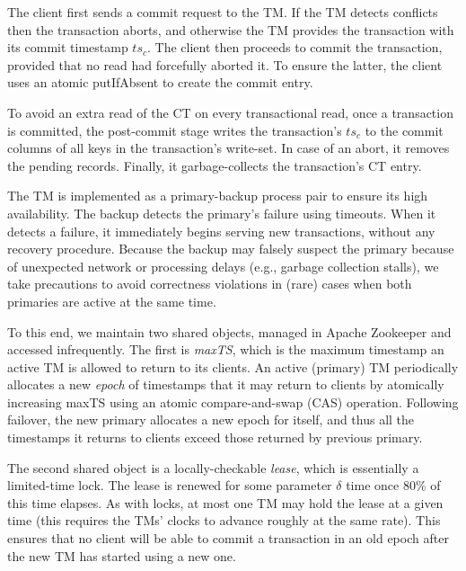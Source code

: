 The client first 
sends a commit request to the TM. 
If the TM detects conflicts then the transaction aborts, and otherwise the TM provides the transaction with its commit  timestamp $ts_c$. 
The client then proceeds to commit the transaction, provided that no read had forcefully aborted  it. To ensure the latter, the client uses 
an atomic putIfAbsent to create the commit entry. 

To avoid an extra read of the CT on every transactional read, once a transaction is committed, the post-commit stage writes 
the transaction's $ts_c$ to the commit columns of all keys in  the transaction's write-set. 
In case of an abort, it removes the pending records.
Finally, it garbage-collects the transaction's CT entry. 


 The TM is implemented as a primary-backup process pair to ensure its high availability. 
The backup detects the primary's failure using timeouts. When it detects a failure, it immediately begins serving new
transactions, without any recovery procedure. Because the backup may falsely suspect the primary because of
unexpected network or processing delays (e.g., garbage collection stalls), we take precautions to avoid correctness
violations in (rare) cases when both primaries are active at the same time.

To this end, we maintain two shared objects, managed in Apache Zookeeper and accessed infrequently.
The first is \emph{maxTS}, which is the maximum timestamp an active TM is allowed to return to its clients.
An active (primary) TM periodically allocates a new \emph{epoch} of timestamps that it may return to clients by atomically
increasing maxTS using an atomic compare-and-swap (CAS) operation.  
Following failover, the new primary  allocates a new epoch for itself, and thus all the timestamps it returns to clients
exceed those returned by previous primary. 

The second shared object is a locally-checkable \emph{lease}, which is essentially a  limited-time lock.
The lease is renewed for some parameter $\delta$  time once 80\% of this time elapses.
As with locks, at most one TM may hold the lease at a given time (this requires the TMs' clocks to advance roughly at the same rate). 
This ensures that no client will be able to commit a transaction in an old epoch after the new TM has started 
using a new one.




